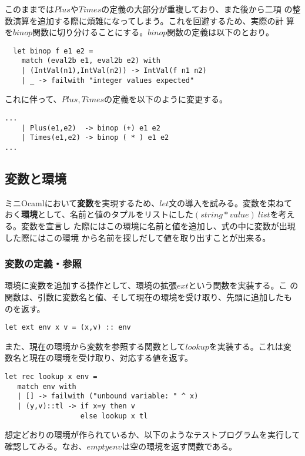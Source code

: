 \documentclass[a4paper,9pt]{jsarticle}
\begin{document}
このままでは$Plus$や$Times$の定義の大部分が重複しており、また後から二項
の整数演算を追加する際に煩雑になってしまう。これを回避するため、実際の計
算を$binop$関数に切り分けることにする。$binop$関数の定義は以下のとおり。

\begin{lstlisting}
  let binop f e1 e2 =
    match (eval2b e1, eval2b e2) with
    | (IntVal(n1),IntVal(n2)) -> IntVal(f n1 n2)
    | _ -> failwith "integer values expected"
\end{lstlisting}

これに伴って、$Plus,Times$の定義を以下のように変更する。

\begin{lstlisting}
...
    | Plus(e1,e2)  -> binop (+) e1 e2
    | Times(e1,e2) -> binop ( * ) e1 e2
...
\end{lstlisting}

\subsection{変数と環境}
ミニOcamlにおいて{\bf{変数}}を実現するため、$let$文の導入を試みる。変数を束ねて
おく{\bf{環境}}として、名前と値のタプルをリストにした$(string *
value)\ list$を考える。変数を宣言し
た際にはこの環境に名前と値を追加し、式の中に変数が出現した際にはこの環境
から名前を探しだして値を取り出すことが出来る。

\subsubsection{変数の定義・参照}
環境に変数を追加する操作として、環境の拡張$ext$という関数を実装する。こ
の関数は、引数に変数名と値、そして現在の環境を受け取り、先頭に追加したも
のを返す。

\begin{lstlisting}
let ext env x v = (x,v) :: env
\end{lstlisting}

また、現在の環境から変数を参照する関数として$lookup$を実装する。これは変
数名と現在の環境を受け取り、対応する値を返す。

\begin{lstlisting}
let rec lookup x env =
   match env with
   | [] -> failwith ("unbound variable: " ^ x)
   | (y,v)::tl -> if x=y then v 
                  else lookup x tl 
\end{lstlisting}

想定どおりの環境が作られているか、以下のようなテストプログラムを実行して
確認してみる。なお、$emptyenv$は空の環境を返す関数である。
\end{document}
